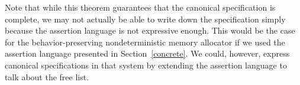 \begin{comment}
\ifextended
\begin{proof}
Let $\Psi$ be the canonical specification of $C$ on the set of all smallest safe states $S$. Consider any
valid triple $\assertm{P}{C}{Q}$. We will show that for any $\sigma \in P$, we can
derive the triple $\assertd{\{\sigma\}}{C}{Q}$ using our restricted set of inference rules~--- an 
application of the disjunction rule then completes the proof.

Consider any state $\sigma \in P$. Since $\assertm{P}{C}{Q}$ is valid, $\lnot \relate{\den{C}}{\sigma}{\fault}$.
We will show with a simple induction on the subheap operator that $\sigma_0 \preceq \sigma$ for some smallest 
safe state $\sigma_0$. Note that we can perform such an induction because the subheap operator is well-founded.

\begin{case2}
$\sigma$ is a smallest safe state. Then $\sigma \preceq \sigma$, and we are done.
\end{case2}

\begin{case2}
$\sigma$ is not a smallest safe state. Since $\lnot \relate{\den{C}}{\sigma}{\fault}$, $\sigma$ is by 
definition a safe state. Therefore, there must be some strictly smaller safe state $\sigma_0 \prec \sigma$. 
By our induction hypothesis, $\sigma_0' \preceq \sigma_0$ for some smallest safe state $\sigma_0'$. Hence we have 
$\sigma_0' \preceq \sigma_0 \preceq \sigma$.
\end{case2}

Now let $\sigma = \sigma_0 \bullet \sigma_1$, where $\sigma_0$ is a smallest safe state. Then there is
an axiom $\assert{\{\sigma_0\}}{C}{\behave{\den{C}}{\sigma_0}} \in \Psi$. We use the axiom rule to get
$\assertd{\{\sigma_0\}}{C}{\behave{\den{C}}{\sigma_0}}$, followed by the frame rule to get
$\assertd{\{\sigma\}}{C}{\behave{\den{C}}{\sigma_0} * \{\sigma_1\}}$. Consider any $\sigma' \in \behave{\den{C}}{\sigma_0} * \{\sigma_1\}$.
Then $\sigma' = \sigma_0' \dt \sigma_1$ for some $\sigma_0'$ such that $\relate{\den{C}}{\sigma_0}{\sigma_0'}$.
By the Forwards Frame Property, $\relate{\den{C}}{\sigma}{\sigma'}$. Since the triple $\assertm{P}{C}{Q}$ is valid
and $\sigma \in P$, we see that $\sigma' \in Q$. Thus we have shown that 
$\behave{\den{C}}{\sigma_0} * \{\sigma_1\} \subseteq Q$, and so an application of the consequence rule gives us the
desired $\assertd{\{\sigma\}}{C}{Q}$.
\end{proof}
\fi
\end{comment}
Note that while this theorem guarantees that the canonical specification is complete, we may not
actually be able to write down the specification simply because the assertion language is not 
expressive enough. This would be the case for the behavior-preserving nondeterministic memory
allocator if we used the assertion language presented in Section~\ref{concrete}. We could, however,
express canonical specifications in that system by extending the assertion language to talk about 
the free list.

